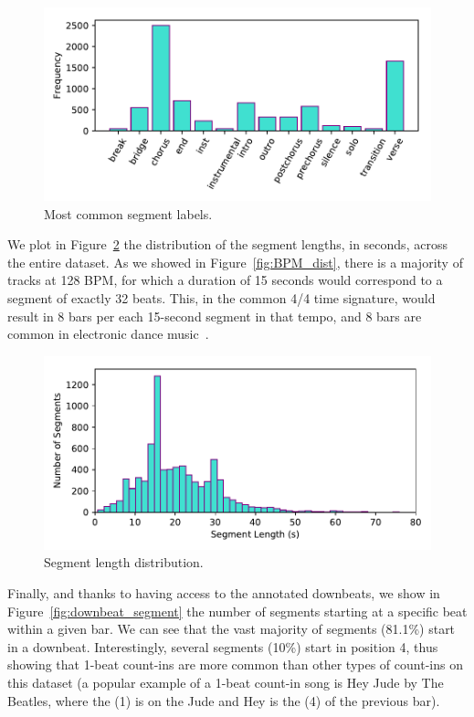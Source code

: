 \documentclass{article}
\begin{document}
\begin{figure}
    \centerline{\includegraphics[width=\columnwidth]{figs/SegmentLabels_distribution.pdf}}
    \caption{Most common segment labels.}
    \label{fig:seglabel_dist}
\end{figure}

We plot in Figure~\ref{fig:seglen_dist} the distribution of the segment lengths, in seconds, across the entire dataset.
As we showed in Figure~\ref{fig:BPM_dist}, there is a majority of tracks at 128 BPM, for which a duration of 15 seconds would correspond to a segment of exactly 32 beats.
This, in the common 4/4 time signature, would result in 8 bars per each 15-second segment in that tempo, and 8 bars are common in electronic dance music~\cite{Moelants2008}.

\begin{figure}
    \centerline{\includegraphics[width=\columnwidth]{figs/SegmentLength_distribution.pdf}}
    \caption{Segment length distribution.}
    \label{fig:seglen_dist}
\end{figure}

Finally, and thanks to having access to the annotated downbeats, we show in Figure~\ref{fig:downbeat_segment} the number of segments starting at a specific beat within a given bar.
We can see that the vast majority of segments (81.1\%) start in a downbeat.
Interestingly, several segments (10\%) start in position 4, thus showing that 1-beat count-ins are more common than other types of count-ins on this dataset (a popular example of a 1-beat count-in song is Hey Jude by The Beatles, where the (1) is on the Jude and Hey is the (4) of the previous bar).
\end{document}
